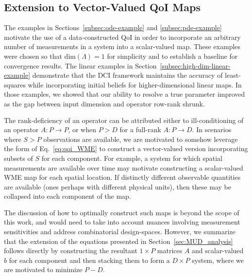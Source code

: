 
\subsection{Extension to Vector-Valued QoI Maps}
The examples in Sections~\ref{subsec:ode-example} and \ref{subsec:pde-example} motivate the use of a data-constructed QoI in order to incorporate an arbitrary number of measurements in a system into a scalar-valued map.
These examples were chosen so that $\text{dim}({\Lambda}) = 1$ for simplicity and to establish a baseline for convergence results.
The linear examples in Section~\ref{subsec:high-dim-linear-example} demonstrate that the DCI framework maintains the accuracy of least-squares while incorporating initial beliefs for higher-dimensional linear maps.
In those examples, we showed that our ability to resolve a true parameter improved as the gap between input dimension and operator row-rank shrunk.

The rank-deficiency of an operator can be attributed either to ill-conditioning of an operator $A:P\to P$, or when $P>D$ for a full-rank $A:P\to D$.
In scenarios where $S>P$ observations are available, we are motivated to somehow leverage the form of Eq.~\eqref{eq:qoi_WME} to construct a vector-valued version incorporating subsets of $S$ for each component.
For example, a system for which spatial measurements are available over time may motivate constructing a scalar-valued WME map for each spatial location.
If distinctly different observable quantities are available (ones perhaps with different physical units), then these may be collapsed into each component of the map.

The discussion of how to optimally construct such maps is beyond the scope of this work, and would need to take into account nuances involving measurement sensitivities and address combinatorial design-spaces.
However, we summarize that the extension of the equations presented in Section~\ref{sec:MUD_analysis} follows directly by constructing the resultant $1\times P$ matrices $A$ and scalar-valued $b$ for each component and then stacking them to form a $D\times P$ system, where we are motivated to minimize $P-D$.


